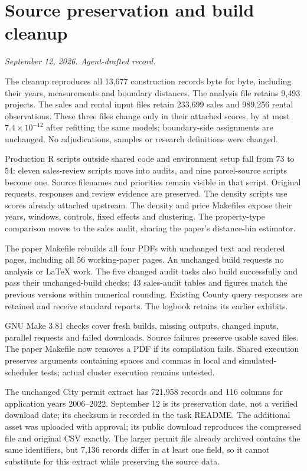 \section*{Source preservation and build cleanup}
\textit{September 12, 2026. Agent-drafted record.}

The cleanup reproduces all 13,677 construction records byte for byte, including
their years, measurements and boundary distances. The analysis file retains
9,493 projects. The sales and rental input files retain 233,699 sales and
989,256 rental observations. These three files change only in their attached
scores, by at most $7.4\times10^{-12}$ after refitting the same models;
boundary-side assignments are unchanged. No adjudications, samples or research
definitions were changed.

Production R scripts outside shared code and environment setup fall from 73
to 54: eleven sales-review scripts move into audits, and nine parcel-source
scripts become one. Source filenames and priorities remain visible in that
script. Original requests, responses and review evidence are preserved.
The density scripts use scores already attached upstream. The density and
price Makefiles expose their years, windows, controls, fixed effects and
clustering. The property-type comparison moves to the sales audit, sharing
the paper's distance-bin estimator.

The paper Makefile rebuilds all four PDFs with unchanged text and rendered
pages, including all 56 working-paper pages. An unchanged build requests no
analysis or LaTeX work. The five changed audit tasks also build successfully
and pass their unchanged-build checks; 43 sales-audit tables and figures match
the previous versions within numerical rounding. Existing County query
responses are retained and receive standard reports. The logbook retains its
earlier exhibits.

GNU Make 3.81 checks cover fresh builds, missing outputs, changed inputs,
parallel requests and failed downloads. Source failures preserve usable saved
files. The paper Makefile now removes a PDF if its compilation fails.
Shared execution preserves arguments containing spaces and commas in local
and simulated-scheduler tests; actual cluster execution remains untested.

The unchanged City permit extract has 721,958 records and 116 columns for
application years 2006--2022. September 12 is its preservation date, not a
verified download date; its checksum is recorded in the task README. The
additional asset was uploaded with approval; its public download reproduces
the compressed file and original CSV exactly. The larger permit
file already archived contains the same identifiers, but 7,136 records differ
in at least one field, so it cannot substitute for this extract while
preserving the source data.
